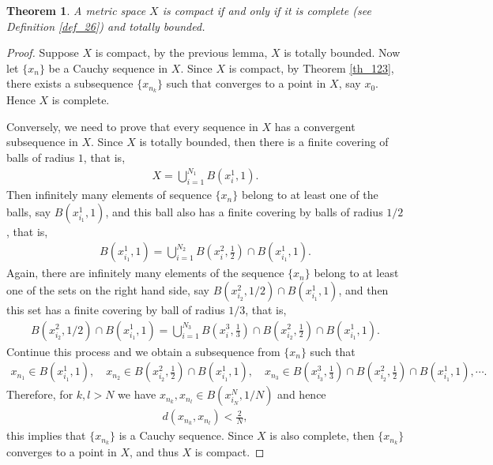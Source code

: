 \documentclass[11pt]{book}
\newtheorem{theorem}{Theorem}[chapter]
\theoremstyle{definition}
\numberwithin{equation}{chapter}
\begin{document}
\begin{theorem}\label{th_125}
A metric space $X$ is compact if and only if it is complete (see Definition \ref{def_26}) and totally bounded.
\end{theorem}
\begin{proof}
Suppose $X$ is compact, by the previous lemma, $X$ is totally bounded. Now let $\{x_n\}$ be a Cauchy sequence in $X$. Since $X$ is compact, by Theorem \ref{th_123}, there exists a subsequence $\{x_{n_k}\}$ such that converges to a point in $X$, say $x_0$. Hence $X$ is complete.

Conversely, we need to prove that every sequence in $X$ has a convergent subsequence in $X$. Since $X$ is totally bounded, then there is a finite covering of balls of radius $1$, that is,
\begin{align*}
    X = \bigcup^{N_1}_{i=1} B\left(x_i^1, 1\right).
\end{align*}
Then infinitely many elements of sequence $\{x_n\}$ belong to at least one of the balls, say $B\left(x_{i_1}^1, 1\right)$, and this ball also has a finite covering by balls of radius $1/2$, that is,
\begin{align*}
    B\left(x_{i_1}^1, 1\right) = \bigcup^{N_2}_{i=1} B\left(x_i^2, \frac{1}{2}\right) \cap B\left(x_{i_1}^1, 1\right).
\end{align*}
Again, there are infinitely many elements of the sequence $\{x_n\}$ belong to at least one of the sets on the right hand side, say $B\left(x_{i_2}^2, 1/2\right) \cap B\left(x_{i_1}^1, 1\right)$, and then this set has a finite covering by ball of radius $1/3$, that is,
\begin{align*}
    B\left(x_{i_2}^2, 1/2\right) \cap B\left(x_{i_1}^1, 1\right) = \bigcup^{N_3}_{i=1} B\left(x_i^3, \frac{1}{3}\right) \cap B\left(x_{i_2}^2, \frac{1}{2}\right) \cap B\left(x_{i_1}^1, 1\right).
\end{align*}
Continue this process and we obtain a subsequence from $\{x_n\}$ such that
\begin{align*}
    x_{n_1} \in B\left(x_{i_1}^1, 1\right), \quad x_{n_2} \in B\left(x_{i_2}^2, \frac{1}{2}\right) \cap B\left(x_{i_1}^1, 1\right), \quad x_{n_3} \in B\left(x_{i_3}^3, \frac{1}{3}\right) \cap B\left(x_{i_2}^2, \frac{1}{2}\right) \cap B\left(x_{i_1}^1, 1\right), \cdots.
\end{align*}
Therefore, for $k,l > N$ we have $x_{n_k}, x_{n_l} \in B\left(x_{i_N}^N, 1/N\right)$ and hence
\begin{align*}
    d(x_{n_k}, x_{n_l}) < \frac{2}{N},
\end{align*}
this implies that $\{x_{n_k}\}$ is a Cauchy sequence. Since $X$ is also complete, then $\{x_{n_k}\}$ converges to a point in $X$, and thus $X$ is compact.
\end{proof}
\end{document}
